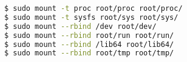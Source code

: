 
\begin{lstlisting}[language=bash, caption={Mounten der von chroot benötigten Verzeichnisse},label={lst:chroot-mount}]
$ sudo mount -t proc root/proc root/proc/
$ sudo mount -t sysfs root/sys root/sys/
$ sudo mount --rbind /dev root/dev/
$ sudo mount --rbind root/run root/run/
$ sudo mount --rbind /lib64 root/lib64/
$ sudo mount --rbind root/tmp root/tmp/
\end{lstlisting}